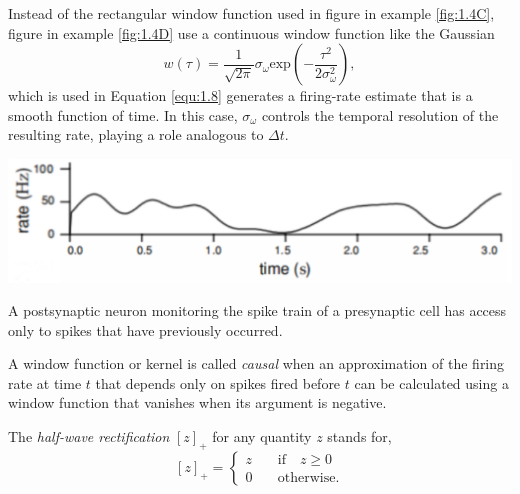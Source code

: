 \begin{exm}
  \label{fig:1.4D}
  Instead of the rectangular window function used in figure in example \ref{fig:1.4C}, 
  figure in example \ref{fig:1.4D} use a 
  continuous window function like the Gaussian
  \begin{equation}
    \label{equ:1.11}
    w(\tau)=\frac{1}{\sqrt{2\pi}}\sigma_{\omega}\text{exp}\left(-\frac{\tau^2}{2\sigma_{\omega}^2} \right),  
  \end{equation}
   which is used in Equation \ref{equ:1.8} generates 
a firing-rate estimate that is a smooth function of time.
In this case, $\sigma_{\omega}$  controls the temporal resolution of the resulting rate, 
playing a role analogous to $\Delta t$.
\end{exm}

\begin{center}
  \includegraphics[scale=0.245]{./png/fig_1_4D.png}
\end{center}

\begin{prin}
  A postsynaptic neuron monitoring the spike train of a presynaptic cell has
access only to spikes that have previously occurred.
\end{prin}

\begin{defn}
  A window function or kernel is called \emph{causal} when an approximation
of the firing rate at time $t$ that depends only on spikes fired before $t$ can
be calculated using a window function that vanishes when its argument is negative.

\end{defn}

\begin{defn}
  The \emph{half-wave rectification} $[z]_+$ for any quantity $z$ stands for,
\begin{equation}
  \label{equ:1.13}
  [z]_+ =\left\{
    \begin{aligned}
      z \quad &\text{if} \quad z\geqslant 0\\
      0 \quad & \text{otherwise}.
    \end{aligned}
  \right.
\end{equation}
\end{defn}

